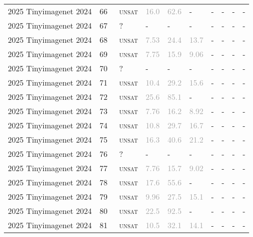 \begin{center}
{\begin{longtable}{@{}llllllllll@{}}
2025 Tinyimagenet 2024 & 66 & ~\textsc{unsat} & \textcolor{darkgray}{16.0} & \textcolor{darkgray}{62.6} & - & - & - & - & - \\
2025 Tinyimagenet 2024 & 67 & ~? & - & - & - & - & - & - & - \\
2025 Tinyimagenet 2024 & 68 & ~\textsc{unsat} & \textcolor{darkgray}{7.53} & \textcolor{darkgray}{24.4} & \textcolor{darkgray}{13.7} & - & - & - & - \\
2025 Tinyimagenet 2024 & 69 & ~\textsc{unsat} & \textcolor{darkgray}{7.75} & \textcolor{darkgray}{15.9} & \textcolor{darkgray}{9.06} & - & - & - & - \\
2025 Tinyimagenet 2024 & 70 & ~? & - & - & - & - & - & - & - \\
2025 Tinyimagenet 2024 & 71 & ~\textsc{unsat} & \textcolor{darkgray}{10.4} & \textcolor{darkgray}{29.2} & \textcolor{darkgray}{15.6} & - & - & - & - \\
2025 Tinyimagenet 2024 & 72 & ~\textsc{unsat} & \textcolor{darkgray}{25.6} & \textcolor{darkgray}{85.1} & - & - & - & - & - \\
2025 Tinyimagenet 2024 & 73 & ~\textsc{unsat} & \textcolor{darkgray}{7.76} & \textcolor{darkgray}{16.2} & \textcolor{darkgray}{8.92} & - & - & - & - \\
2025 Tinyimagenet 2024 & 74 & ~\textsc{unsat} & \textcolor{darkgray}{10.8} & \textcolor{darkgray}{29.7} & \textcolor{darkgray}{16.7} & - & - & - & - \\
2025 Tinyimagenet 2024 & 75 & ~\textsc{unsat} & \textcolor{darkgray}{16.3} & \textcolor{darkgray}{40.6} & \textcolor{darkgray}{21.2} & - & - & - & - \\
2025 Tinyimagenet 2024 & 76 & ~? & - & - & - & - & - & - & - \\
2025 Tinyimagenet 2024 & 77 & ~\textsc{unsat} & \textcolor{darkgray}{7.76} & \textcolor{darkgray}{15.7} & \textcolor{darkgray}{9.02} & - & - & - & - \\
2025 Tinyimagenet 2024 & 78 & ~\textsc{unsat} & \textcolor{darkgray}{17.6} & \textcolor{darkgray}{55.6} & - & - & - & - & - \\
2025 Tinyimagenet 2024 & 79 & ~\textsc{unsat} & \textcolor{darkgray}{9.96} & \textcolor{darkgray}{27.5} & \textcolor{darkgray}{15.1} & - & - & - & - \\
2025 Tinyimagenet 2024 & 80 & ~\textsc{unsat} & \textcolor{darkgray}{22.5} & \textcolor{darkgray}{92.5} & - & - & - & - & - \\
2025 Tinyimagenet 2024 & 81 & ~\textsc{unsat} & \textcolor{darkgray}{10.5} & \textcolor{darkgray}{32.1} & \textcolor{darkgray}{14.1} & - & - & - & - \\

\end{longtable}}
\end{center}
